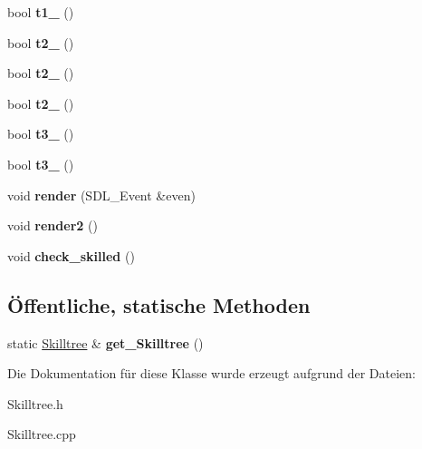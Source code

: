 \begin{DoxyCompactItemize}
\item 
\hypertarget{class_skilltree_ac22abb2448aa780e5d310b6572170ab0}{bool {\bfseries t1\-\_} ()}\label{class_skilltree_ac22abb2448aa780e5d310b6572170ab0}

\item 
\hypertarget{class_skilltree_a4cc4fcaa43ae3deb0c66963d2dc939f7}{bool {\bfseries t2\-\_} ()}\label{class_skilltree_a4cc4fcaa43ae3deb0c66963d2dc939f7}

\item 
\hypertarget{class_skilltree_a3892f72f56d98cb9eab26d5375fb2d2e}{bool {\bfseries t2\-\_} ()}\label{class_skilltree_a3892f72f56d98cb9eab26d5375fb2d2e}

\item 
\hypertarget{class_skilltree_ab2a53b0b26afc12430ec1ecfa5c66114}{bool {\bfseries t2\-\_} ()}\label{class_skilltree_ab2a53b0b26afc12430ec1ecfa5c66114}

\item 
\hypertarget{class_skilltree_aa3ad81736a15c4672708bd3bd685806d}{bool {\bfseries t3\-\_} ()}\label{class_skilltree_aa3ad81736a15c4672708bd3bd685806d}

\item 
\hypertarget{class_skilltree_a6b0f90f9bcbc468241dcb0b8f5e6fd50}{bool {\bfseries t3\-\_} ()}\label{class_skilltree_a6b0f90f9bcbc468241dcb0b8f5e6fd50}

\item 
\hypertarget{class_skilltree_ac33bd425bec067ce79466825ffd9eeeb}{void {\bfseries render} (S\-D\-L\-\_\-\-Event \&even)}\label{class_skilltree_ac33bd425bec067ce79466825ffd9eeeb}

\item 
\hypertarget{class_skilltree_a01f048624ac0e92490e94ca3ee8fbece}{void {\bfseries render2} ()}\label{class_skilltree_a01f048624ac0e92490e94ca3ee8fbece}

\item 
\hypertarget{class_skilltree_a381be34321e485720229fd73913905d3}{void {\bfseries check\-\_\-skilled} ()}\label{class_skilltree_a381be34321e485720229fd73913905d3}

\end{DoxyCompactItemize}
\subsection*{Öffentliche, statische Methoden}
\begin{DoxyCompactItemize}
\item 
\hypertarget{class_skilltree_af11a355bb085e638952ee5d9b15d6b0a}{static \hyperlink{class_skilltree}{Skilltree} \& {\bfseries get\-\_\-\-Skilltree} ()}\label{class_skilltree_af11a355bb085e638952ee5d9b15d6b0a}

\end{DoxyCompactItemize}


Die Dokumentation für diese Klasse wurde erzeugt aufgrund der Dateien\-:\begin{DoxyCompactItemize}
\item 
Skilltree.\-h\item 
Skilltree.\-cpp\end{DoxyCompactItemize}
